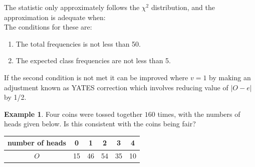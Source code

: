 \documentclass[11pt,a4paper]{article}
\theoremstyle{definition}
\newtheorem{example}[thm]{Example}
\begin{document}
The statistic only approximately follows the $\chi^2$ distribution, and the approximation is adequate when:\\

The conditions for these are:
\begin{enumerate}
\item The total frequencies is not less than 50.
\item The expected class frequencies are not less than 5.\\
\end{enumerate}

If the second condition is not met it can be improved where $v=1$ by making an adjustment known as YATES correction which involves reducing value of $|O-e|$ by 1/2.\\[1ex]




\begin{example}
Four coins were tossed together $160$ times, with the numbers of heads given below. Is this consistent with the coins being fair?

\begin{table}[H]
\centering
\begin{tabular}{c|ccccc}
number of heads & 0& 1& 2& 3&4\\
\hline $O$ & 15& 46& 54& 35& 10\\
\end{tabular}
\end{table} 
\end{example}




\vspace{3cm}
\end{document}
